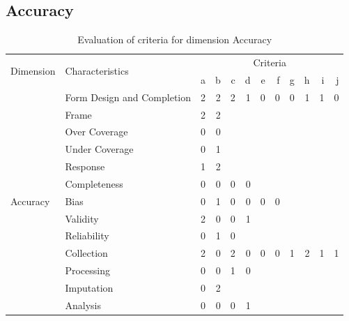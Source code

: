 \subsection{Accuracy}

\begin{table}[htbp]
    \centering

    \begin{tabular}{llrrrrrrrrrr}
        \toprule
        \multirow{2}{*}{Dimension}  & \multirow{2}{*}{Characteristics}  & \multicolumn{10}{c}{Criteria}         \\ \cmidrule(lr){3-12}
                                    &                                   & a & b & c & d & e & f & g & h & i & j \\ \midrule
        \multirow{13}{*}{Accuracy}  & Form Design and Completion        & 2 & 2 & 2 & 1 & 0 & 0 & 0 & 1 & 1 & 0 \\
                                    & Frame                             & 2 & 2 &   &   &   &   &   &   &   &   \\
                                    & Over Coverage                     & 0 & 0 &   &   &   &   &   &   &   &   \\
                                    & Under Coverage                    & 0 & 1 &   &   &   &   &   &   &   &   \\
                                    & Response                          & 1 & 2 &   &   &   &   &   &   &   &   \\
                                    & Completeness                      & 0 & 0 & 0 & 0 &   &   &   &   &   &   \\
                                    & Bias                              & 0 & 1 & 0 & 0 & 0 & 0 &   &   &   &   \\
                                    & Validity                          & 2 & 0 & 0 & 1 &   &   &   &   &   &   \\
                                    & Reliability                       & 0 & 1 & 0 &   &   &   &   &   &   &   \\
                                    & Collection                        & 2 & 0 & 2 & 0 & 0 & 0 & 1 & 2 & 1 & 1 \\
                                    & Processing                        & 0 & 0 & 1 & 0 &   &   &   &   &   &   \\
                                    & Imputation                        & 0 & 2 &   &   &   &   &   &   &   &   \\
                                    & Analysis                          & 0 & 0 & 0 & 1 &   &   &   &   &   &   \\
        \bottomrule
    \end{tabular}

    \caption{Evaluation of criteria for dimension Accuracy}
    \label{table:accuracy-benchmark}
\end{table}
\FloatBarrier

